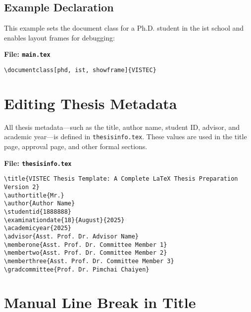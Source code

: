 \documentclass{VISTEC}
\begin{document}
\subsection{Example Declaration}
\label{manual:class-example}

\begin{subparagraph}
This example sets the document class for a Ph.D. student in the ist school and enables layout frames for debugging:
\end{subparagraph}

\noindent\textbf{File: \texttt{main.tex}}\vspace{-1.5em}
\begin{verbatim}
\documentclass[phd, ist, showframe]{VISTEC}
\end{verbatim}







\section{Editing Thesis Metadata}
\label{manual:metadata}

\begin{paragraph}
All thesis metadata—such as the title, author name, student ID, advisor, and academic year—is defined in \texttt{thesisinfo.tex}. These values are used in the title page, approval page, and other formal sections.
\end{paragraph}

\newpage

\noindent\textbf{File: \texttt{thesisinfo.tex}}\vspace{-1.5em}
\begin{verbatim}
\title{VISTEC Thesis Template: A Complete LaTeX Thesis Preparation Version 2}
\authortitle{Mr.}
\author{Author Name}
\studentid{1888888}
\examinationdate{18}{August}{2025}
\academicyear{2025}
\advisor{Asst. Prof. Dr. Advisor Name}
\memberone{Asst. Prof. Dr. Committee Member 1}
\membertwo{Asst. Prof. Dr. Committee Member 2}
\memberthree{Asst. Prof. Dr. Committee Member 3}
\gradcommittee{Prof. Dr. Pimchai Chaiyen}
\end{verbatim}

\section{Manual Line Break in Title}
\label{manual:metadata-linebreak}
\end{document}
